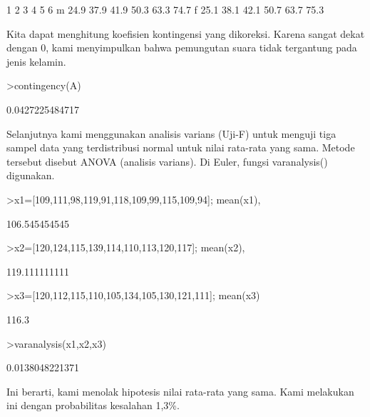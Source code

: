 \documentclass{article}
\begin{document}
\begin{eulernotebook}
\begin{eulercomment}
\begin{eulercomment}
\begin{euleroutput}
             1     2     3     4     5     6
       m  24.9  37.9  41.9  50.3  63.3  74.7
       f  25.1  38.1  42.1  50.7  63.7  75.3
\end{euleroutput}
\begin{eulercomment}
Kita dapat menghitung koefisien kontingensi yang dikoreksi. Karena
sangat dekat dengan 0, kami menyimpulkan bahwa pemungutan suara tidak
tergantung pada jenis kelamin.
\end{eulercomment}
\begin{eulerprompt}
>contingency(A)
\end{eulerprompt}
\begin{euleroutput}
  0.0427225484717
\end{euleroutput}
\begin{eulercomment}
Selanjutnya kami menggunakan analisis varians (Uji-F) untuk menguji
tiga sampel data yang terdistribusi normal untuk nilai rata-rata yang
sama. Metode tersebut disebut ANOVA (analisis varians). Di Euler,
fungsi varanalysis() digunakan.
\end{eulercomment}
\begin{eulerprompt}
>x1=[109,111,98,119,91,118,109,99,115,109,94]; mean(x1),
\end{eulerprompt}
\begin{euleroutput}
  106.545454545
\end{euleroutput}
\begin{eulerprompt}
>x2=[120,124,115,139,114,110,113,120,117]; mean(x2),
\end{eulerprompt}
\begin{euleroutput}
  119.111111111
\end{euleroutput}
\begin{eulerprompt}
>x3=[120,112,115,110,105,134,105,130,121,111]; mean(x3)
\end{eulerprompt}
\begin{euleroutput}
  116.3
\end{euleroutput}
\begin{eulerprompt}
>varanalysis(x1,x2,x3)
\end{eulerprompt}
\begin{euleroutput}
  0.0138048221371
\end{euleroutput}
\begin{eulercomment}
Ini berarti, kami menolak hipotesis nilai rata-rata yang sama. Kami
melakukan ini dengan probabilitas kesalahan 1,3\%.


\end{eulercomment}
\end{eulercomment}
\end{eulercomment}
\end{eulernotebook}
\end{document}
